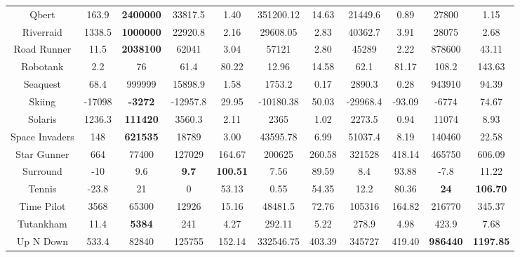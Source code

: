 \documentclass[nohyperref]{article}
\newcommand{\best}[1]{\textbf{#1}}
\theoremstyle{plain}
\begin{document}
\begin{table}[!hb]
\begin{center}
\begin{tabular}{|c| c| c| c c| c c| c c| c c| }
 Qbert              & 163.9     & \textbf{2400000}   & 33817.5  &1.40    & 351200.12  & 14.63      & 21449.6 & 0.89      &27800             &1.15          \\
 Riverraid          & 1338.5    & \textbf{1000000}   & 22920.8  &2.16    & 29608.05   & 2.83       & 40362.7 & 3.91      &28075             &2.68           \\
 Road Runner        & 11.5      & \textbf{2038100}   & 62041    &3.04    & 57121      & 2.80       & 45289   & 2.22      &878600            &43.11          \\
 Robotank           & 2.2       & 76        & 61.4     &80.22   & 12.96      & 14.58      & 62.1    & 81.17     &108.2               &143.63  \\
 Seaquest           & 68.4      & 999999    & 15898.9  &1.58    & 1753.2     & 0.17       & 2890.3  & 0.28      &943910	             &94.39\\
 Skiing             & -17098    & \textbf{-3272}     & -12957.8 &29.95   & -10180.38  & 50.03      & -29968.4& -93.09    &-6774             &74.67        \\
 Solaris            & 1236.3    & \textbf{111420}    & 3560.3   &2.11    & 2365       & 1.02       & 2273.5  & 0.94      &11074             &8.93          \\
 Space Invaders     & 148       & \textbf{621535 }   & 18789    &3.00    & 43595.78   & 6.99       & 51037.4 & 8.19      &140460            &22.58          \\
 Star Gunner        & 664       & 77400     & 127029   &164.67  & 200625     & 260.58     & 321528  & 418.14    &465750              &606.09  \\
 Surround           & -10       & 9.6       & \textbf{9.7}      &\textbf{100.51}  & 7.56       & 89.59      & 8.4     & 93.88  &-7.8        &11.22          \\
 Tennis             & -23.8     & 21        & 0        &53.13   & 0.55       & 54.35      & 12.2    & 80.36     &\best{24       }           &\best{106.70    }\\
 Time Pilot         & 3568      & 65300     & 12926    &15.16   & 48481.5    & 72.76      & 105316  & 164.82    &216770              &345.37         \\
 Tutankham          & 11.4      & \textbf{5384}      & 241      &4.27    & 292.11     & 5.22       & 278.9   & 4.98      &423.9             &7.68           \\
 Up N Down          & 533.4     & 82840     & 125755   &152.14  & 332546.75  & 403.39     & 345727  & 419.40    &\best{986440}              &\best{1197.85  } \\

\end{tabular}
\end{center}
\end{table}
\end{document}
